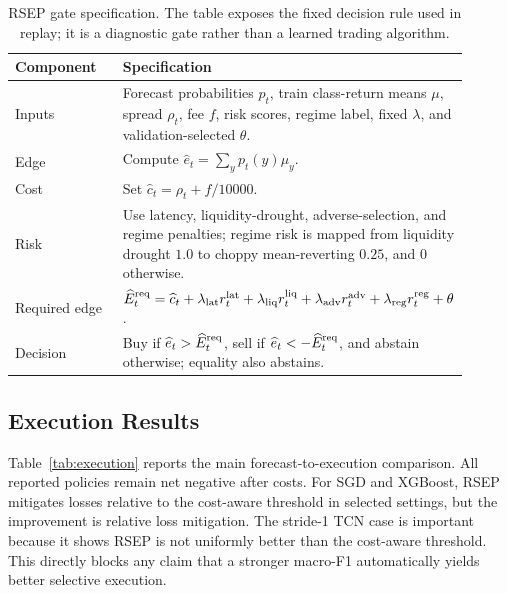 \documentclass[conference]{IEEEtran}
\begin{document}
\begin{table}[t]
\centering
\caption{RSEP gate specification. The table exposes the fixed decision rule used in replay; it is a diagnostic gate rather than a learned trading algorithm.}
\label{alg:rsep_gate}
\scriptsize
\begin{tabular}{p{0.28\linewidth}p{0.62\linewidth}}
\toprule
Component & Specification \\
\midrule
Inputs & Forecast probabilities $p_t$, train class-return means $\mu$, spread $\rho_t$, fee $f$, risk scores, regime label, fixed $\lambda$, and validation-selected $\theta$. \\
Edge & Compute $\widehat{e}_t=\sum_y p_t(y)\mu_y$. \\
Cost & Set $\widehat{c}_t=\rho_t+f/10000$. \\
Risk & Use latency, liquidity-drought, adverse-selection, and regime penalties; regime risk is mapped from liquidity drought $1.0$ to choppy mean-reverting $0.25$, and $0$ otherwise. \\
Required edge & $\widehat{E}^{\rm req}_t=\widehat{c}_t+\lambda_{\rm lat}r^{\rm lat}_t+\lambda_{\rm liq}r^{\rm liq}_t+\lambda_{\rm adv}r^{\rm adv}_t+\lambda_{\rm reg}r^{\rm reg}_t+\theta$. \\
Decision & Buy if $\widehat{e}_t>\widehat{E}^{\rm req}_t$, sell if $\widehat{e}_t<-\widehat{E}^{\rm req}_t$, and abstain otherwise; equality also abstains. \\
\bottomrule
\end{tabular}
\end{table}

\subsection{Execution Results}
Table~\ref{tab:execution} reports the main forecast-to-execution comparison. All reported policies remain net negative after costs. For SGD and XGBoost, RSEP mitigates losses relative to the cost-aware threshold in selected settings, but the improvement is relative loss mitigation. The stride-1 TCN case is important because it shows RSEP is not uniformly better than the cost-aware threshold. This directly blocks any claim that a stronger macro-F1 automatically yields better selective execution.
\end{document}
